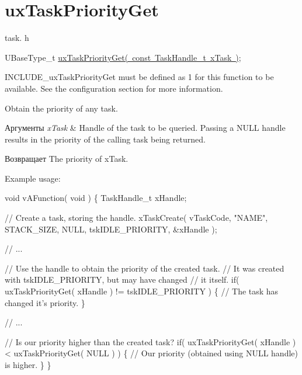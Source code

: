 \hypertarget{group__ux_task_priority_get}{}\section{ux\+Task\+Priority\+Get}
\label{group__ux_task_priority_get}
task. h 
\begin{DoxyPre}UBaseType\_t \mbox{\hyperlink{task_8h_a18d1148c845f5c4bff3b9e5b2077e058}{uxTaskPriorityGet( const TaskHandle\_t xTask )}};\end{DoxyPre}


I\+N\+C\+L\+U\+D\+E\+\_\+ux\+Task\+Priority\+Get must be defined as 1 for this function to be available. See the configuration section for more information.

Obtain the priority of any task.


\begin{DoxyParams}{Аргументы}
{\em x\+Task} & Handle of the task to be queried. Passing a N\+U\+LL handle results in the priority of the calling task being returned.\\
\hline
\end{DoxyParams}
\begin{DoxyReturn}{Возвращает}
The priority of x\+Task.
\end{DoxyReturn}
Example usage\+: 
\begin{DoxyPre}
void vAFunction( void )
\{
TaskHandle\_t xHandle;\end{DoxyPre}



\begin{DoxyPre}    // Create a task, storing the handle.
    xTaskCreate( vTaskCode, "NAME", STACK\_SIZE, NULL, tskIDLE\_PRIORITY, \&xHandle );\end{DoxyPre}



\begin{DoxyPre}    // ...\end{DoxyPre}



\begin{DoxyPre}    // Use the handle to obtain the priority of the created task.
    // It was created with tskIDLE\_PRIORITY, but may have changed
    // it itself.
    if( uxTaskPriorityGet( xHandle ) != tskIDLE\_PRIORITY )
    \{
     // The task has changed it's priority.
    \}\end{DoxyPre}



\begin{DoxyPre}    // ...\end{DoxyPre}



\begin{DoxyPre}    // Is our priority higher than the created task?
    if( uxTaskPriorityGet( xHandle ) < uxTaskPriorityGet( NULL ) )
    \{
     // Our priority (obtained using NULL handle) is higher.
    \}
\}
  \end{DoxyPre}
 